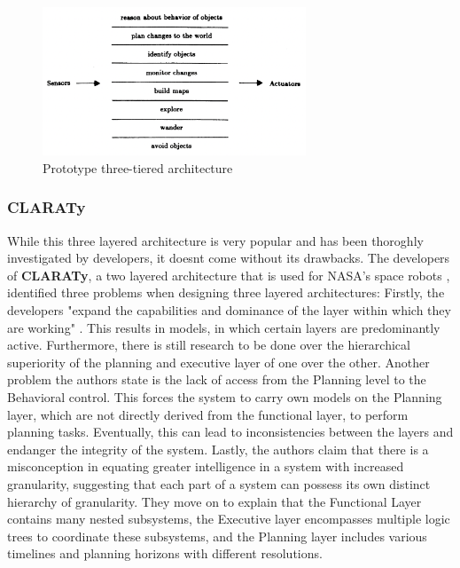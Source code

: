 \documentclass[]{article}
\begin{document}
	\begin{figure}[ht]
		\centering
		\includegraphics[width=0.7\textwidth]{Graphics/three-layered-Architecture}
		\caption{Prototype three-tiered architecture \autocite{sicilianoSpringerHandbookRobotics2016}}
		\label{fig: fig3}
	\end{figure}
	\newpage
	\subsubsection{CLARATy}
	While this three layered architecture is very popular and has been thoroghly investigated by developers, it doesnt come without its drawbacks. The developers of \textbf{CLARATy}, a two layered architecture that is used for NASA's space robots \autocite{sicilianoSpringerHandbookRobotics2016}, identified three problems when designing three layered architectures:
	Firstly, the developers "expand the capabilities and dominance of the layer within which they are working" \autocite{volpeCLARAtyArchitectureRobotic2001}. This results in models, in which certain layers are predominantly active. Furthermore, there is still research to be done over the hierarchical superiority of the planning and executive layer of one over the other. \autocite{volpeCLARAtyArchitectureRobotic2001} Another problem the authors state is the lack of access from the Planning level to the Behavioral control. This forces the system to carry own models on the Planning layer, which are not directly derived from the functional layer, to perform planning tasks. Eventually, this can lead to inconsistencies between the layers and endanger the integrity of the system. \autocite{volpeCLARAtyArchitectureRobotic2001} Lastly, the authors claim that there is a misconception in equating greater intelligence in a system with increased granularity, suggesting that each part of a system can possess its own distinct hierarchy of granularity. They move on to explain that the Functional Layer contains many nested subsystems, the Executive layer encompasses multiple logic trees to coordinate these subsystems, and the Planning layer includes various timelines and planning horizons with different resolutions. \autocite{volpeCLARAtyArchitectureRobotic2001}
\end{document}

